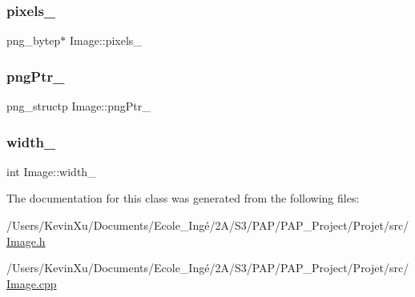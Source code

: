 \subsubsection{\texorpdfstring{pixels\+\_\+}{pixels\_}}
{\footnotesize\ttfamily png\+\_\+bytep$\ast$ Image\+::pixels\+\_\+\hspace{0.3cm}{\ttfamily [private]}}

\mbox{\label{class_image_aaf607d2596bac09b13370599d9ba6d8c}} 
\subsubsection{\texorpdfstring{png\+Ptr\+\_\+}{pngPtr\_}}
{\footnotesize\ttfamily png\+\_\+structp Image\+::png\+Ptr\+\_\+\hspace{0.3cm}{\ttfamily [private]}}

\mbox{\label{class_image_a4c2d8a01ecf1b7438f57f93357080e08}} 
\subsubsection{\texorpdfstring{width\+\_\+}{width\_}}
{\footnotesize\ttfamily int Image\+::width\+\_\+\hspace{0.3cm}{\ttfamily [private]}}



The documentation for this class was generated from the following files\+:\begin{DoxyCompactItemize}
\item 
/\+Users/\+Kevin\+Xu/\+Documents/\+Ecole\+\_\+\+Ingé/2\+A/\+S3/\+P\+A\+P/\+P\+A\+P\+\_\+\+Project/\+Projet/src/\mbox{\hyperlink{_image_8h}{Image.\+h}}\item 
/\+Users/\+Kevin\+Xu/\+Documents/\+Ecole\+\_\+\+Ingé/2\+A/\+S3/\+P\+A\+P/\+P\+A\+P\+\_\+\+Project/\+Projet/src/\mbox{\hyperlink{_image_8cpp}{Image.\+cpp}}\end{DoxyCompactItemize}
